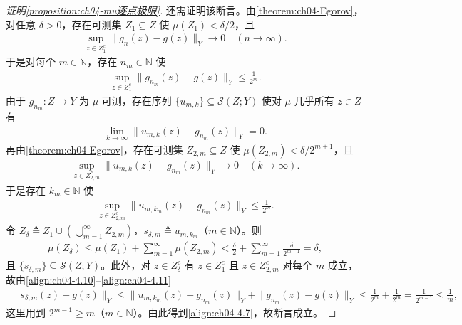 \documentclass[../../main.tex]{subfiles}%
\begin{document}
\begin{proof}[证明\cref{proposition:ch04-mu逐点极限}]
还需证明该断言。由\cref{theorem:ch04-Egorov}，对任意 $\delta>0$，存在可测集 $Z_1\subseteq Z$ 使 $\mu(Z_1)<\delta/2$，且
\begin{align*}
\sup_{z\in Z_1^c}\|g_n(z)-g(z)\|_Y\to0\quad(n\to\infty).
\end{align*}
于是对每个 $m\in\mathbb{N}$，存在 $n_m\in\mathbb{N}$ 使
\begin{align}
\sup_{z\in Z_1^c}\|g_{n_m}(z)-g(z)\|_Y\leqslant\frac1{2^m}. \label{align:ch04-4.10}
\end{align}
由于 $g_{n_m}:Z\to Y$ 为 $\mu$-可测，存在序列 $\{u_{m,k}\}\subseteq\mathcal{S}(Z;Y)$ 使对 $\mu$-几乎所有 $z\in Z$ 有
\begin{align*}
\lim_{k\to\infty}\|u_{m,k}(z)-g_{n_m}(z)\|_Y=0.
\end{align*}
再由\cref{theorem:ch04-Egorov}，存在可测集 $Z_{2,m}\subseteq Z$ 使 $\mu(Z_{2,m})<\delta/2^{m+1}$，且
\begin{align*}
\sup_{z\in Z_{2,m}^c}\|u_{m,k}(z)-g_{n_m}(z)\|_Y\to0\quad(k\to\infty).
\end{align*}
于是存在 $k_m\in\mathbb{N}$ 使
\begin{align}
\sup_{z\in Z_{2,m}^c}\|u_{m,k_m}(z)-g_{n_m}(z)\|_Y\leqslant\frac1{2^m}. \label{align:ch04-4.11}
\end{align}
令 $Z_\delta\triangleq Z_1\cup(\bigcup_{m=1}^\infty Z_{2,m})$，$s_{\delta,m}\triangleq u_{m,k_m}$（$m\in\mathbb{N}$）。则
\begin{align*}
\mu(Z_\delta)\leqslant\mu(Z_1)+\sum_{m=1}^\infty\mu(Z_{2,m})<\frac{\delta}{2}+\sum_{m=1}^\infty\frac{\delta}{2^{m+1}}=\delta,
\end{align*}
且 $\{s_{\delta,m}\}\subseteq\mathcal{S}(Z;Y)$。此外，对 $z\in Z_\delta^c$ 有 $z\in Z_1^c$ 且 $z\in Z_{2,m}^c$ 对每个 $m$ 成立，故由\eqref{align:ch04-4.10}--\eqref{align:ch04-4.11}
\begin{align*}
\|s_{\delta,m}(z)-g(z)\|_Y\leqslant\|u_{m,k_m}(z)-g_{n_m}(z)\|_Y+\|g_{n_m}(z)-g(z)\|_Y\leqslant\frac1{2^m}+\frac1{2^m}=\frac1{2^{m-1}}\leqslant\frac1m,
\end{align*}
这里用到 $2^{m-1}\geqslant m$（$m\in\mathbb{N}$）。由此得到\eqref{align:ch04-4.7}，故断言成立。


\end{proof}
\end{document}
